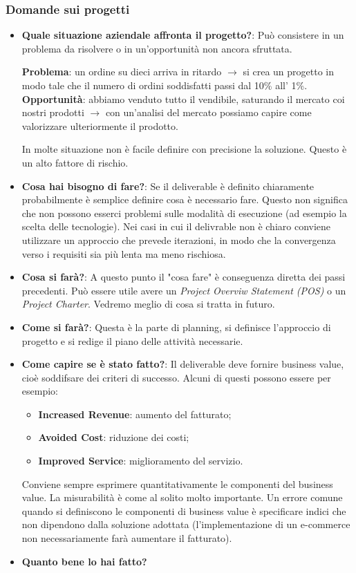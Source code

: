 \subsubsection{Domande sui progetti}
\begin{itemize}
	\item \textbf{Quale situazione aziendale affronta il progetto?}: Può consistere in un problema da risolvere o in un'opportunità non ancora sfruttata.
	\begin{info}[Esempio]
		\textbf{Problema}: un ordine su dieci arriva in ritardo $\xrightarrow{}$ si crea un progetto in modo tale che il numero di ordini soddisfatti passi dal 10\% all' 1\%.\newline
		\textbf{Opportunità}: abbiamo venduto tutto il vendibile, saturando il mercato coi nostri prodotti $\xrightarrow{}$ con un'analisi del mercato possiamo capire come valorizzare ulteriormente il prodotto.
	\end{info}
	In molte situazione non è facile definire con precisione la soluzione. Questo è un alto fattore di rischio.
	\item \textbf{Cosa hai bisogno di fare?}: Se il deliverable è definito chiaramente probabilmente è semplice definire cosa è necessario fare. Questo non significa che non possono esserci problemi sulle modalità di esecuzione (ad esempio la scelta delle tecnologie). Nei casi in cui il delivrable non è chiaro conviene utilizzare un approccio che prevede iterazioni, in modo che la convergenza verso i requisiti sia più lenta ma meno rischiosa.
	\item \textbf{Cosa si farà?}: A questo punto il "cosa fare" è conseguenza diretta dei passi precedenti. Può essere utile avere un \textit{Project Overviw Statement (POS)} o un \textit{Project Charter}. Vedremo meglio di cosa si tratta in futuro.
	\item \textbf{Come si farà?}: Questa è la parte di planning, si definisce l'approccio di progetto e si redige il piano delle attività necessarie.
	\item \textbf{Come capire se è stato fatto?}: Il deliverable deve fornire business value, cioè soddifsare dei criteri di successo. Alcuni di questi possono essere per esempio:
	\begin{itemize}
		\item \textbf{Increased Revenue}: aumento del fatturato;
		\item \textbf{Avoided Cost}: riduzione dei costi;
		\item \textbf{Improved Service}: miglioramento del servizio.
	\end{itemize}
	Conviene sempre esprimere quantitativamente le componenti del business value. La misurabilità è come al solito molto importante. Un errore comune quando si definiscono le componenti di business value è specificare indici che non dipendono dalla soluzione adottata (l'implementazione di un e-commerce non necessariamente farà aumentare il fatturato).
	\item \textbf{Quanto bene lo hai fatto?}
\end{itemize}
